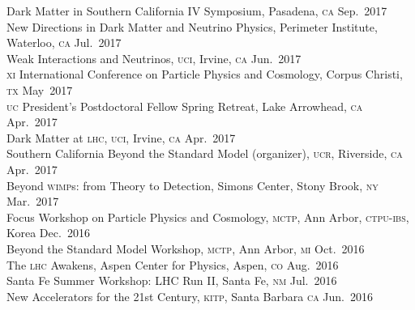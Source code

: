 \documentclass[margin,line]{resume}
\newcommand{\scap}[1]{\textsc{\MakeLowercase{#1}}}
\begin{document}
\begin{resume}
Dark Matter in Southern California IV Symposium, Pasadena, \scap{CA}
\hfill Sep.~2017\vspace{.7mm}\\   
%   
New Directions in Dark Matter and Neutrino Physics, Perimeter Institute, Waterloo, \scap{CA}
\hfill %
Jul.~2017\vspace{.7mm}\\   
%
Weak Interactions and Neutrinos, \scap{UCI}, Irvine, \scap{CA}
\hfill Jun.~2017\vspace{.7mm}\\   
%
\scap{XI} International Conference on Particle Physics and Cosmology, Corpus Christi, \scap{TX}
\hfill May~2017\vspace{.7mm}\\   
%
\scap{UC} President's Postdoctoral Fellow Spring Retreat, Lake Arrowhead, \scap{CA}
\hfill Apr.~2017\vspace{.7mm}\\   
%
Dark Matter at \scap{LHC}, \scap{UCI}, Irvine, \scap{CA}
\hfill Apr.~2017\vspace{.7mm}\\   
%
Southern California Beyond the Standard Model (organizer), \scap{UCR}, Riverside, \scap{CA}
\hfill Apr.~2017\vspace{.7mm}\\   
%
Beyond \scap{WIMP}s: from Theory to Detection, Simons Center, Stony Brook, \scap{NY}
\hfill Mar.~2017\vspace{.7mm}\\   
%
Focus Workshop on Particle Physics and Cosmology, \scap{MCTP}, Ann Arbor, \scap{CTPU-IBS}, Korea
\hfill Dec.~2016\vspace{.7mm}\\   
%
Beyond the Standard Model Workshop, \scap{MCTP}, Ann Arbor, \scap{MI}
\hfill Oct.~2016\vspace{.7mm}\\   
%
The \scap{LHC} Awakens, Aspen Center for Physics, Aspen, \scap{CO}
\hfill Aug.~2016\vspace{.7mm}\\   
%
Santa Fe Summer Workshop: LHC Run II, Santa Fe, \scap{NM}
\hfill
Jul.~2016\vspace{.7mm}\\   
% 
New Accelerators for the 21st Century, \scap{KITP}, Santa Barbara \scap{CA}
\hfill 
Jun.~2016\vspace{.7mm}\\   

\end{resume}
\end{document}

